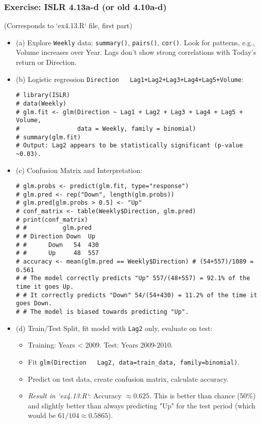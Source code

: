 \documentclass[12pt,a4paper]{article}
\newcommand{\Rfunction}[1]{\texttt{#1()}} %
\newcommand{\Robject}[1]{\texttt{#1}} %
\newcommand{\Rcode}[1]{\texttt{#1}} %
\begin{document}
\begin{itemize}
    \subsubsection{Exercise: ISLR 4.13a-d (or old 4.10a-d) }
        (Corresponds to `ex4.13.R` file, first part)
        \begin{itemize}
            \item (a) Explore \Robject{Weekly} data: \Rfunction{summary}, \Rfunction{pairs}, \Rfunction{cor}.
                Look for patterns, e.g., Volume increases over Year. Lags don't show strong correlations with Today's return or Direction.
            \item (b) Logistic regression \Rcode{Direction ~ Lag1+Lag2+Lag3+Lag4+Lag5+Volume}:
\begin{lstlisting}[caption={Logistic Regression on Weekly Data (ISLR 4.13b)}]
# library(ISLR)
# data(Weekly)
# glm.fit <- glm(Direction ~ Lag1 + Lag2 + Lag3 + Lag4 + Lag5 + Volume,
#                data = Weekly, family = binomial)
# summary(glm.fit)
# Output: Lag2 appears to be statistically significant (p-value ~0.03).
\end{lstlisting}
            \item (c) Confusion Matrix and Interpretation:
\begin{lstlisting}[caption={Confusion Matrix for Weekly Data Logistic Model (ISLR 4.13c)}]
# glm.probs <- predict(glm.fit, type="response")
# glm.pred <- rep("Down", length(glm.probs))
# glm.pred[glm.probs > 0.5] <- "Up"
# conf_matrix <- table(Weekly$Direction, glm.pred)
# print(conf_matrix)
# #          glm.pred
# # Direction Down  Up
# #      Down   54  430
# #      Up     48  557
# accuracy <- mean(glm.pred == Weekly$Direction) # (54+557)/1089 = 0.561
# # The model correctly predicts "Up" 557/(48+557) = 92.1% of the time it goes Up.
# # It correctly predicts "Down" 54/(54+430) = 11.2% of the time it goes Down.
# # The model is biased towards predicting "Up".
\end{lstlisting}
            \item (d) Train/Test Split, fit model with \Rcode{Lag2} only, evaluate on test:
                \begin{itemize}
                    \item Training: Years < 2009. Test: Years 2009-2010.
                    \item Fit \Rcode{glm(Direction ~ Lag2, data=train_data, family=binomial)}.
                    \item Predict on test data, create confusion matrix, calculate accuracy.
                    \item \textit{Result in `ex4.13.R`}: Accuracy $\approx 0.625$. This is better than chance (50\%) and slightly better than always predicting "Up" for the test period (which would be $61/104 \approx 0.5865$).
                \end{itemize}
        \end{itemize}



\end{itemize}
\end{document}
